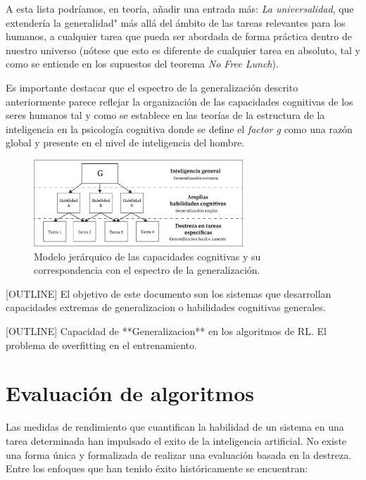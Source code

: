A esta lista podríamos, en teoría, añadir una entrada más: \textit{La universalidad}, que extendería la generalidad" más allá del ámbito de las tareas relevantes para los humanos, a cualquier tarea que pueda ser abordada de forma práctica dentro de nuestro universo (nótese que esto es diferente de cualquier tarea en absoluto, tal y como se entiende en los supuestos del teorema \textit{No Free Lunch}).

Es importante destacar que el espectro de la generalización descrito anteriormente parece reflejar la organización de las capacidades cognitivas de los seres humanos tal y como se establece en las teorías de la estructura de la inteligencia en la psicología cognitiva donde se define el \textit{factor g} como una razón global y presente en el nivel de inteligencia del hombre. 

\begin{figure}[ht!]
    \centering
    \includegraphics[width=0.7\textwidth]{Graphics/g-factor.png}
    \caption{Modelo jerárquico de las capacidades cognitivas y su correspondencia con el espectro de la generalización.}
    \label{fig:g-factor}
\end{figure}

[OUTLINE]
El objetivo de este documento son los sistemas que desarrollan capacidades extremas de generalizacion o habilidades cognitivas generales.

[OUTLINE]
Capacidad de **Generalizacion** en los algoritmos de RL. El problema de overfitting en el entrenamiento.

\section{Evaluación de algoritmos}\label{section:state-of-the-art:evaluating-algoritms}

Las medidas de rendimiento que cuantifican la habilidad de un sistema en una tarea determinada han impulsado el exito de la inteligencia artificial. No existe una forma única y formalizada de realizar una evaluación basada en la destreza. Entre los enfoques que han tenido éxito históricamente se encuentran:


